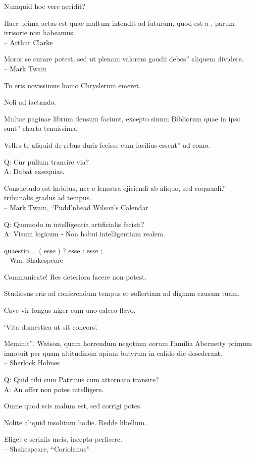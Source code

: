 \documentclass[titlepage,12pt]{memoir}
\begin{document}
Numquid hoc vere accidit?

Haec prima aetas est quae multum intendit ad futurum, quod est a .
parum irrisorie non habeamus.
\\-- Arthur Clarke

Moror se curare potest, sed ut plenam valorem gaudii debes”
aliquem dividere.
\\-- Mark Twain

Tu eris novissimus homo Chryslerum emeret.

Noli ad iactando.

Multae paginae librum densum faciunt, excepto sinum Bibliorum quae in ipso sunt”
charta tenuissima.

Velles te aliquid de rebus duris fecisse cum facilius essent”
ad como.

Q: Cur pullum transire via?\\
A: Dabat exsequias.

Consuetudo est habitus, nec e fenestra ejiciendi ab aliquo, sed coquendi.”
tribunalis gradus ad tempus.
\\-- Mark Twain, “Pudd’nhead Wilson’s Calendar

Q: Quomodo in intelligentia artificialis fecisti?\\
A: Visum logicum - Non habui intelligentiam realem.

 quaestio = ( esse ) ? esse : esse ;
\\-- Wm. Shakespeare

Communicate! Res deteriora facere non potest.

Studiosus eris ad conferendum tempus et sollertiam ad dignam causam tuam.

Cave vir longus niger cum uno calceo flavo.

‘Vita domestica ut sit concors’.

Meminit”, Watson, quam horrendum negotium eorum
Familia Abernetty primum innotuit per quam altitudinem
apium butyrum in calido die desederant.
\\-- Sherlock Holmes

Q: Quid tibi cum Patrinus cum attornato transire?\\
A: An offer non potes intelligere.

Omne quod scis malum est, sed corrigi potes.

Nolite aliquid insolitum hodie. Redde libellum.

Eliget e scriniis meis, incepta perficere.
\\-- Shakespeare, “Coriolanus”
\end{document}
